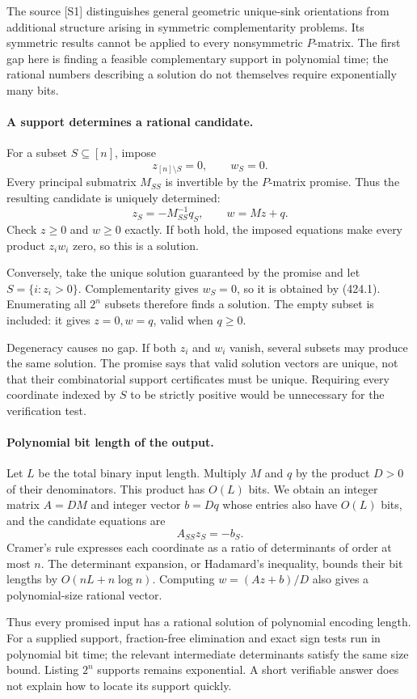 \documentclass[11pt]{article}
\begin{document}
The source [S1] distinguishes general geometric unique-sink orientations from additional structure arising in symmetric complementarity problems. Its symmetric results cannot be applied to every nonsymmetric $P$-matrix. The first gap here is finding a feasible complementary support in polynomial time; the rational numbers describing a solution do not themselves require exponentially many bits.

\paragraph{A support determines a rational candidate.}
For a subset $S\subseteq[n]$, impose
\[
 z_{[n]\setminus S}=0,\qquad w_S=0.
\]
Every principal submatrix $M_{SS}$ is invertible by the $P$-matrix promise. Thus the resulting candidate is uniquely determined:
\[
 z_S=-M_{SS}^{-1}q_S,\qquad w=Mz+q.
 \tag{424.1}
\]
Check $z\ge0$ and $w\ge0$ exactly. If both hold, the imposed equations make every product $z_iw_i$ zero, so this is a solution.

Conversely, take the unique solution guaranteed by the promise and let $S=\{i:z_i>0\}$. Complementarity gives $w_S=0$, so it is obtained by (424.1). Enumerating all $2^n$ subsets therefore finds a solution. The empty subset is included: it gives $z=0,w=q$, valid when $q\ge0$.

Degeneracy causes no gap. If both $z_i$ and $w_i$ vanish, several subsets may produce the same solution. The promise says that valid solution vectors are unique, not that their combinatorial support certificates must be unique. Requiring every coordinate indexed by $S$ to be strictly positive would be unnecessary for the verification test.

\paragraph{Polynomial bit length of the output.}
Let $L$ be the total binary input length. Multiply $M$ and $q$ by the product $D>0$ of their denominators. This product has $O(L)$ bits. We obtain an integer matrix $A=DM$ and integer vector $b=Dq$ whose entries also have $O(L)$ bits, and the candidate equations are
\[
 A_{SS}z_S=-b_S.
\]
Cramer's rule expresses each coordinate as a ratio of determinants of order at most $n$. The determinant expansion, or Hadamard's inequality, bounds their bit lengths by $O(nL+n\log n)$. Computing $w=(Az+b)/D$ also gives a polynomial-size rational vector.

Thus every promised input has a rational solution of polynomial encoding length. For a supplied support, fraction-free elimination and exact sign tests run in polynomial bit time; the relevant intermediate determinants satisfy the same size bound. Listing $2^n$ supports remains exponential. A short verifiable answer does not explain how to locate its support quickly.
\end{document}
